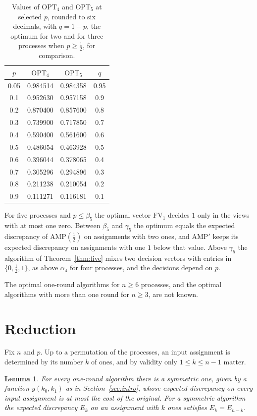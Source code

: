 \documentclass[11pt]{article}
\newtheorem{lemma}[theorem]{Lemma}
\newcommand{\OPT}{\mathrm{OPT}}
\newcommand{\h}{\tfrac12}
\begin{document}
\begin{table}[t]
\centering
\small
\begin{tabular}{cccc}
\toprule
$p$ & $\OPT_4$ & $\OPT_5$ & $q$\\
\midrule
0.05 & 0.984514 & 0.984358 & 0.95\\
0.1 & 0.952630 & 0.957158 & 0.9\\
0.2 & 0.870400 & 0.857600 & 0.8\\
0.3 & 0.739900 & 0.717850 & 0.7\\
0.4 & 0.590400 & 0.561600 & 0.6\\
0.5 & 0.486054 & 0.463928 & 0.5\\
0.6 & 0.396044 & 0.378065 & 0.4\\
0.7 & 0.305296 & 0.294896 & 0.3\\
0.8 & 0.211238 & 0.210054 & 0.2\\
0.9 & 0.111271 & 0.116181 & 0.1\\
\bottomrule
\end{tabular}
\caption{Values of $\OPT_4$ and $\OPT_5$ at selected $p$, rounded to six decimals, with $q=1-p$, the optimum for two and for three processes when $p\ge\h$, for comparison.}\label{tab:values}
\end{table}

For five processes and $p\le\beta_5$ the optimal vector $\mathrm{FV}_1$ decides $1$ only in the views with at most one zero. Between $\beta_5$ and $\gamma_5$ the optimum equals the expected discrepancy of AMP$(\h)$ on assignments with two ones, and $\mathrm{AMP}'$ keeps its expected discrepancy on assignments with one $1$ below that value. Above $\gamma_5$ the algorithm of Theorem~\ref{thm:five} mixes two decision vectors with entries in $\{0,\h,1\}$, as above $\alpha_4$ for four processes, and the decisions depend on $p$.

The optimal one-round algorithms for $n\ge6$ processes, and the optimal algorithms with more than one round for $n\ge3$, are not known.

\section{Reduction}

Fix $n$ and $p$. Up to a permutation of the processes, an input assignment is determined by its number $k$ of ones, and by validity only $1\le k\le n-1$ matter.

\begin{lemma}\label{lem:sym}
For every one-round algorithm there is a symmetric one, given by a function $y(k_0,k_1)$ as in Section~\ref{sec:intro}, whose expected discrepancy on every input assignment is at most the cost of the original. For a symmetric algorithm the expected discrepancy $E_k$ on an assignment with $k$ ones satisfies $E_k=E_{n-k}$.
\end{lemma}
\end{document}
